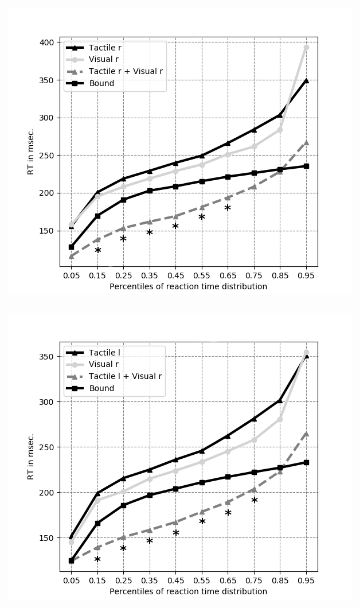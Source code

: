 \documentclass[12pt]{article}
\begin{document}
\begin{figure}[t!]
        \centering
        \begin{subfigure}[b]{0.475\textwidth}
            \centering
            \includegraphics[width=\textwidth]{RMITest_VrTr_lines.png}
            \caption[]%
            {{\small}}    
            \label{fig:6a}
        \end{subfigure}
        \hfill
        \begin{subfigure}[b]{0.475\textwidth}  
            \centering 
            \includegraphics[width=\textwidth]{RMITest_VrTl_lines.png}

\end{subfigure}
\end{figure}
\end{document}
